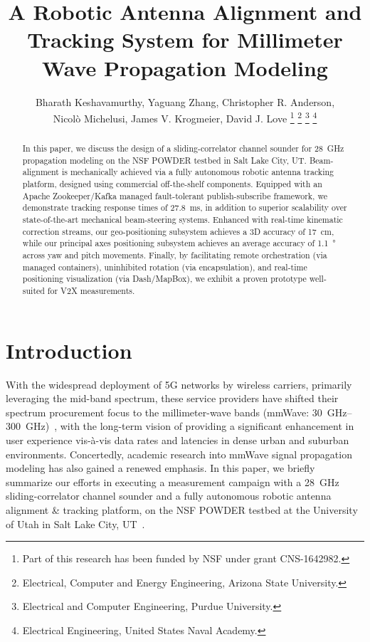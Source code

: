 \documentclass[10pt,twocolumn]{IEEEtran}
\title{A Robotic Antenna Alignment and Tracking System for Millimeter Wave Propagation Modeling}
\author{\vspace{-1mm}Bharath Keshavamurthy\IEEEauthorrefmark{1}, Yaguang Zhang\IEEEauthorrefmark{2}, Christopher R. Anderson\IEEEauthorrefmark{3},\\Nicol\`{o} Michelusi\IEEEauthorrefmark{1}, James V. Krogmeier\IEEEauthorrefmark{2}, David J. Love\IEEEauthorrefmark{2}
\thanks{Part of this research has been funded by NSF under grant CNS-1642982.}
\thanks{\IEEEauthorrefmark{1}Electrical, Computer and Energy Engineering, Arizona State University.}
\thanks{\IEEEauthorrefmark{2}Electrical and Computer Engineering, Purdue University.}
\thanks{\IEEEauthorrefmark{3}Electrical Engineering, United States Naval Academy.}
\vspace{-12mm}}
\begin{document}
\maketitle
\thispagestyle{empty}
\pagestyle{empty}

\newcommand{\linespreadexceptabstractandindex}{\setstretch{0.98}} %
\newcommand{\linespreadforabstractandindex}{\setstretch{0.991}}

\newcommand{\extraspacebeforesec}{-4mm}
\newcommand{\extraspacebeforesubsubsec}{0.2mm}

\linespreadexceptabstractandindex

\begin{abstract}
\linespreadforabstractandindex
In this paper, we discuss the design of a sliding-correlator channel sounder for \SI{28}{\giga\hertz} propagation modeling on the NSF POWDER testbed in Salt Lake City, UT. Beam-alignment is mechanically achieved via a fully autonomous robotic antenna tracking platform, designed using commercial off-the-shelf components. Equipped with an Apache Zookeeper/Kafka managed fault-tolerant publish-subscribe framework, we demonstrate tracking response times of \SI{27.8}{\milli\second}, in addition to superior scalability over state-of-the-art mechanical beam-steering systems. Enhanced with real-time kinematic correction streams, our geo-positioning subsystem achieves a 3D accuracy of \SI{17}{\centi\meter}, while our principal axes positioning subsystem achieves an average accuracy of \SI{1.1}{\degree} across yaw and pitch movements. Finally, by facilitating remote orchestration (via managed containers), uninhibited rotation (via encapsulation), and real-time positioning visualization (via Dash/MapBox), we exhibit a proven prototype well-suited for V2X measurements.
\end{abstract}

\glsresetall

\vspace{\extraspacebeforesec}
\section{Introduction}\label{I}
With the widespread deployment of 5G networks by wireless carriers, primarily leveraging the mid-band spectrum, these service providers have shifted their spectrum procurement focus to the millimeter-wave bands (mmWave: \SIrange{30}{300}{\giga\hertz})~\cite{WSJ:Verizon}, with the long-term vision of providing a significant enhancement in user experience vis-\`{a}-vis data rates and latencies in dense urban and suburban environments. Concertedly, academic research into mmWave signal propagation modeling has also gained a renewed emphasis. In this paper, we briefly summarize our efforts in executing a measurement campaign with a \SI{28}{\giga\hertz} sliding-correlator channel sounder and a fully autonomous robotic antenna alignment \& tracking platform, on the NSF POWDER testbed at the University of Utah in Salt Lake City, UT~\cite{POWDER}. 
\end{document}
